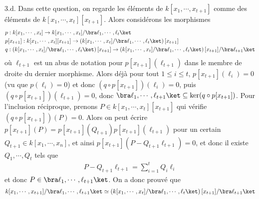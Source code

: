 \documentclass[11pt]{article}
\begin{document}
    \begin{question}{3.d.}
        \label{q3d}
        Dans cette question, on regarde les éléments de $k[x_1, \cdots, x_{t+1}]$ comme des éléments de $k[x_1, \cdots, x_t][x_{t+1}]$. Alors considérons les morphismes
        \begin{align*}
            &p : k[x_1, \cdots, x_t] \to k[x_1, \cdots, x_t]/\bra \ell_1, \cdots, \ell_t \ket \\
            &p[x_{t + 1}] : k[x_1, \cdots, x_t][x_{t+1}] \to \left(k[x_1, \cdots, x_t]/\bra \ell_1, \cdots, \ell_t \ket \right)[x_{t+1}] \\
            &q : \left(k[x_1, \cdots, x_t]/\bra \ell_1, \cdots, \ell_t \ket \right)[x_{t+1}] \to \left(k[x_1, \cdots, x_t]/\bra \ell_1, \cdots, \ell_t \ket \right)[x_{t+1}]/\bra \ell_{t + 1} \ket
        \end{align*}
        où $\ell_{t + 1}$ est un abus de notation pour $p[x_{t + 1}](\ell_{t + 1})$ dans le membre de droite du dernier morphisme. Alors déjà pour tout $1 \leq i \leq t$,  $p[x_{t + 1}](\ell_i) = 0$ (vu que $p(\ell_i) = 0$) et donc $(q \circ p[x_{t + 1}])(\ell_i) = 0$, puis $(q \circ p[x_{t + 1}])(\ell_{t + 1}) = 0$, donc $\bra \ell_1, \cdots, \ell_{t + 1} \ket \subseteq \ker (q \circ p[x_{t + 1}])$. Pour l'inclusion réciproque, prenons $P \in k[x_1, \cdots, x_t][x_{t+1}]$ qui vérifie $(q \circ p[x_{t + 1}])(P) = 0$. Alors on peut écrire $p[x_{t + 1}](P) = p[x_{t + 1}](Q_{t + 1})p[x_{t + 1}](\ell_{t + 1})$ pour un certain $Q_{t + 1} \in k[x_1, \cdots, x_n]$, et ainsi $p[x_{t + 1}](P - Q_{t + 1}\ell_{t + 1}) = 0$, et donc il existe $Q_1, \cdots, Q_t$ tels que
        \begin{align*}
            P - Q_{t + 1}\ell_{t + 1} = \sum_{i = 1}^t Q_i\ell_i
        \end{align*}
        et donc $P \in \bra \ell_1, \cdots, \ell_{t + 1} \ket$. On a donc prouvé que
        \begin{align*}
            k[x_1, \cdots, x_{t + 1}]/\bra \ell_1, \cdots, \ell_{t + 1} \ket \simeq \left(k[x_1, \cdots, x_t]/\bra \ell_1, \cdots, \ell_t \ket \right)[x_{t+1}]/\bra \ell_{t + 1} \ket
        \end{align*}
    \end{question}
\end{document}
